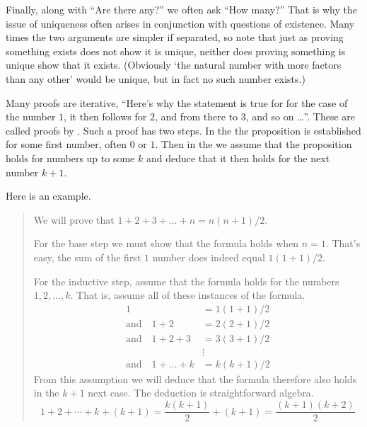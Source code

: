 Finally,
along with ``Are there any?'' we often ask ``How many?''
That is why the issue of uniqueness often arises in conjunction
with questions of existence.
Many times the two arguments are simpler if separated, so note that just as
proving something exists does not show it is unique,
neither does proving something is unique show that it exists.
(Obviously `the natural number with more factors than any other' 
would be unique, but in fact no such number exists.)










{}
Many proofs are iterative,
``Here's why the statement is true for for the case of the number \( 1 \), 
it then follows for \( 2 \), and from there to \( 3 \), and so on \ldots''.
These are called proofs by .
Such a proof has two steps.
In the  
the proposition is established for some first
number, often \( 0 \) or \( 1 \).
Then in the  
we assume that the proposition
holds for numbers up to some \( k \) 
and deduce that it then holds for the next number $k+1$.

Here is an example.

\begin{quote}\small
We will prove that \( 1+2+3+\dots+n=n(n+1)/2 \).

For the base step we must show that the formula holds when \( n=1 \).
That's easy, the sum of the first \( 1 \) number does indeed equal 
\( 1(1+1)/2 \).

For the inductive step, assume that the formula holds
for the numbers \( 1,2,\ldots,k \).
That is, assume all of these instances of the formula.
\begin{align*}
  1
  &=1(1+1)/2  \\
  \text{and}\quad 1+2
  &=2(2+1)/2  \\
  \text{and}\quad  1+2+3
  &=3(3+1)/2  \\
  &\vdots    \\
  \text{and}\quad 1+\dots+k
  &=k(k+1)/2
\end{align*}
From this assumption we will deduce that 
the formula therefore also holds in the \( k+1 \) next case.
The deduction is  straightforward algebra.
\begin{equation*}
  1+2+\cdots+k+(k+1)
  =
  \frac{k(k+1)}{2}+(k+1)
  =
  \frac{(k+1)(k+2)}{2}
\end{equation*}
\end{quote}

